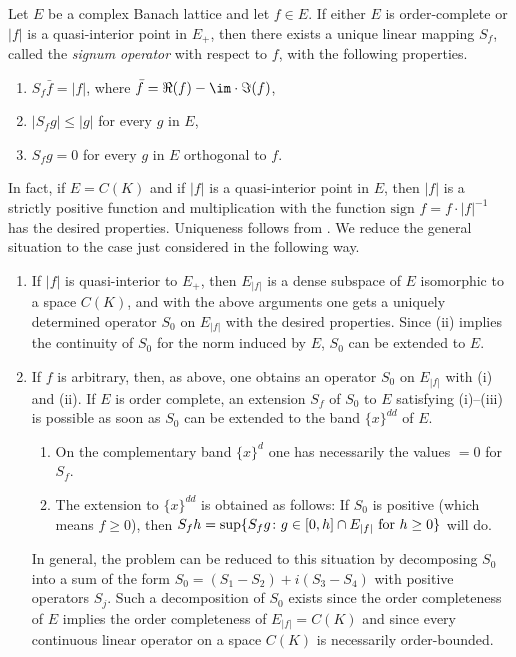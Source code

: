 Let $ E $ be a complex Banach lattice and let $ f \in E $.
If either $ E $ is order-complete or $ |f| $ is a quasi-interior point in $ E_{+} $, then there exists a unique linear mapping $ S_{f} $, called the \emph{signum operator} with respect to $ f $, with the following properties.
\begin{enumerate}[\upshape (i)]

\item  
$ S_{f}\bar{f} = |f| $, where $ \bar{f} = \Re(f) -  \im \cdot\Im(f) $,

\item 
$ |S_{f}g| \leq |g| $ for every $ g $ in $ E $,

\item 
$ S_{f}g = 0 $ for every $ g $ in $ E $ orthogonal to $ f $.
\end{enumerate}
In fact, if\/ $ E = C(K) $ and if\/ $ |f| $ is a quasi-interior point in $ E $, then $ |f| $ is a strictly positive function and multiplication with the function $ \text{sign } f = f\cdot|f|^{-1} $ has the desired properties.
Uniqueness follows from \textcite[Chap. 20]{zaanen:1983}.
We reduce the general situation to the case just considered in the following way.
\begin{enumerate}[\upshape (i), wide, labelindent=.25em]

\item 
If\/ $ |f| $ is quasi-interior to $ E_{+} $, then $ E_{|f|} $ is a dense subspace of\/ $ E $ isomorphic to a space $ C(K) $, and with the above arguments one gets a uniquely determined operator $ S_{0} $ on $ E_{|f|} $ with the desired properties.
Since (ii) implies the continuity of\/ $ S_{0} $ for the norm induced by $ E $, $ S_{0} $ can be extended to $ E $.

\item 
If\/ $ f $ is arbitrary, then, as above, one obtains an operator $ S_{0} $ on $ E_{|f|} $ with (i) and (ii).
If\/ $ E $ is order complete, an extension $ S_{f} $ of\/ $ S_{0} $ to $ E $ satisfying (i)--(iii) is possible as soon as $ S_{0} $ can be extended to the band $ \{x\}^{dd} $ of\/ $ E $.

\begin{enumerate}[--, labelindent=2em]
\item
On the complementary band $ \{x\}^{d} $ one has necessarily the values $ = 0 $ for $ S_{f} $.

\item
The extension to $ \{x\}^{dd} $ is obtained as follows:
If\/ $ S_{0} $ is positive (which means $ f \geq 0 $), then 
$ S_{f}h = \sup \{ S_{f}g \colon g \in [0,h] \cap E_{|f|} \text{ for $ h \geq 0 $} \}$ will do.
\end{enumerate}
In general, the problem can be reduced to this situation by decomposing $ S_{0} $ into a sum of the form $ S_{0} = (S_{1} - S_{2}) + i(S_{3} - S_{4}) $ with positive operators $ S_{j} $.
Such a decomposition of\/ $ S_{0} $ exists since the order completeness of\/ $ E $ implies the order completeness of\/ $ E_{|f|} = C(K) $ and since every continuous linear operator on a space $ C(K) $ is necessarily order-bounded.
\end{enumerate}
